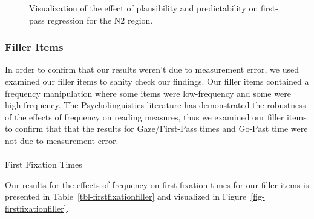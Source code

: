 \documentclass[
  12pt,
  letterpaper,
]{scrreprt}
\makeatletter
\let\oldparagraph\paragraph
\renewcommand{\paragraph}{
    \@ifstar
      \xxxParagraphStar
      \xxxParagraphNoStar
  }
\newcommand{\xxxParagraphStar}[1]{\oldparagraph*{#1}\mbox{}}
\newcommand{\xxxParagraphNoStar}[1]{\oldparagraph{#1}\mbox{}}
\makeatother
\begin{document}
\begin{figure}[htbp]

\caption{\label{fig-firstpassn2}Visualization of the effect of
plausibility and predictability on first-pass regression for the N2
region.}


\end{figure}%

\subsubsection{Filler Items}\label{filler-items}

In order to confirm that our results weren't due to measurement error,
we used examined our filler items to sanity check our findings. Our
filler items contained a frequency manipulation where some items were
low-frequency and some were high-frequency. The Psycholinguistics
literature has demonstrated the robustness of the effects of frequency
on reading measures, thus we examined our filler items to confirm that
that the results for Gaze/First-Pass times and Go-Past time were not due
to measurement error.

\paragraph{First Fixation Times}\label{first-fixation-times-2}

Our results for the effects of frequency on first fixation times for our
filler items is presented in Table~\ref{tbl-firstfixationfiller} and
visualized in Figure~\ref{fig-firstfixationfiller}.
\end{document}
